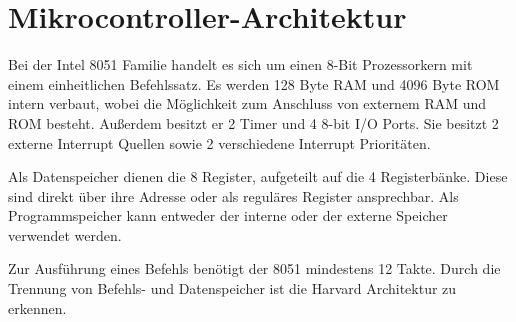 
\chapter{Mikrocontroller-Architektur}\label{mikrocontroller-architektur}

Bei der Intel 8051 Familie handelt es sich um einen 8-Bit Prozessorkern mit einem einheitlichen
Befehlssatz. Es werden 128 Byte \ac{RAM} und 4096 Byte \ac{ROM} intern verbaut, wobei die
Möglichkeit zum Anschluss von externem \ac{RAM} und \ac{ROM} besteht. Außerdem besitzt er 2 Timer
und 4 8-bit \ac{I/O} Ports. Sie besitzt 2 externe Interrupt Quellen sowie 2 verschiedene Interrupt
Prioritäten.

Als Datenspeicher dienen die 8 Register, aufgeteilt auf die 4 Registerbänke. Diese sind direkt über
ihre Adresse oder als reguläres Register ansprechbar. Als Programmspeicher kann entweder der interne
oder der externe Speicher verwendet werden.

Zur Ausführung eines Befehls benötigt der 8051 mindestens 12 Takte. Durch die Trennung von Befehls-
und Datenspeicher ist die Harvard Architektur zu erkennen.